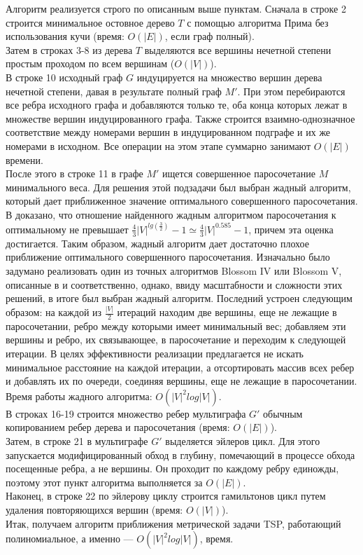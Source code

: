 \documentclass[a4paper]{article}
\begin{document}
\bigskip

Алгоритм реализуется строго по описанным выше пунктам. Сначала в строке 2 строится минимальное остовное дерево $T$ с помощью алгоритма Прима без использования кучи (время: $O(|E|)$, если граф полный).\\
Затем в строках 3-8 из дерева $T$ выделяются все вершины нечетной степени простым проходом по всем вершинам ($O(|V|)$).\\
В строке 10 исходный граф $G$ индуцируется на множество вершин дерева нечетной степени, давая в результате полный граф $M'$. При этом перебираются все ребра исходного графа и добавляются только те, оба конца которых лежат в множестве вершин индуцированного графа. Также строится взаимно-однозначное соответствие между номерами вершин в индуцированном подграфе и их же номерами в исходном. Все операции на этом этапе суммарно занимают $O(|E|)$ времени.\\
После этого в строке 11 в графе $M'$ ищется совершенное паросочетание $M$ минимального веса. Для решения этой подзадачи был выбран жадный алгоритм, который дает приближенное значение оптимального совершенного паросочетания. В \cite{greedy} доказано, что отношение найденного жадным алгоритмом паросочетания к оптимальному не превышает $\frac{4}{3}|V|^{lg(\frac{3}{2})}-1\simeq \frac{4}{3}|V|^{0.585}-1$, причем эта оценка достигается. Таким образом, жадный алгоритм дает достаточно плохое приближение оптимального совершенного паросочетания. Изначально было задумано реализовать один из точных алгоритмов Blossom IV или Blossom V, описанные в \cite{blossomiv} и \cite{blossomv} соответственно, однако, ввиду масштабности и сложности этих решений, в итоге был выбран жадный алгоритм. Последний устроен следующим образом: на каждой из $\frac{|V|}{2}$ итераций находим две вершины, еще не лежащие в паросочетании, ребро между которыми имеет минимальный вес; добавляем эти вершины и ребро, их связывающее, в паросочетание и переходим к следующей итерации. В целях эффективности реализации предлагается не искать минимальное расстояние на каждой итерации, а отсортировать массив всех ребер и добавлять их по очереди, соединяя вершины, еще не лежащие в паросочетании. Время работы жадного алгоритма: $O(|V|^2log|V|)$. \cite{greedy,greedy2}\\
В строках 16-19 строится множество ребер мультиграфа $G'$ обычным копированием ребер дерева и паросочетания (время: $O(|E|)$).\\
Затем, в строке 21 в мультиграфе $G'$ выделяется эйлеров цикл. Для этого запускается модифицированный обход в глубину, помечающий в процессе обхода посещенные ребра, а не вершины. Он проходит по каждому ребру единожды, поэтому этот пункт алгоритма выполняется за $O(|E|)$.\\
Наконец, в строке 22 по эйлерову циклу строится гамильтонов цикл путем удаления повторяющихся вершин (время: $O(|V|)$).\\
Итак, получаем алгоритм приближения метрической задачи TSP, работающий полиномиальное, а именно --- $O(|V|^2log|V|)$, время.
\end{document}
